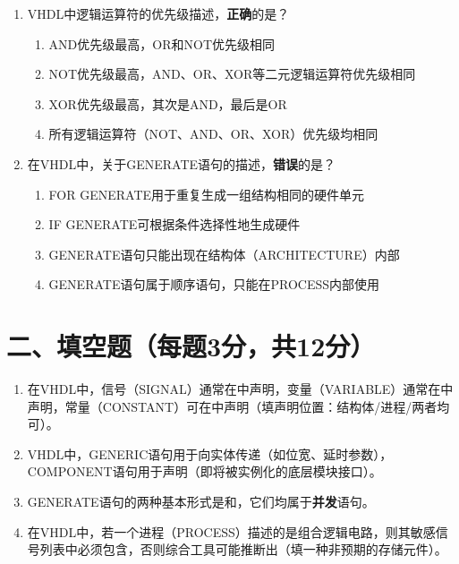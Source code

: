\begin{enumerate}[label=\arabic*.]
\item VHDL中逻辑运算符的优先级描述，\textbf{正确}的是？
\begin{enumerate}[label=\Alph*.]
  \item AND优先级最高，OR和NOT优先级相同
  \item NOT优先级最高，AND、OR、XOR等二元逻辑运算符优先级相同
  \item XOR优先级最高，其次是AND，最后是OR
  \item 所有逻辑运算符（NOT、AND、OR、XOR）优先级均相同
\end{enumerate}

\item 在VHDL中，关于GENERATE语句的描述，\textbf{错误}的是？
\begin{enumerate}[label=\Alph*.]
  \item FOR GENERATE用于重复生成一组结构相同的硬件单元
  \item IF GENERATE可根据条件选择性地生成硬件
  \item GENERATE语句只能出现在结构体（ARCHITECTURE）内部
  \item GENERATE语句属于顺序语句，只能在PROCESS内部使用
\end{enumerate}

\end{enumerate}

\section*{二、填空题（每题3分，共12分）}

\begin{enumerate}[label=\arabic*.]

\item 在VHDL中，信号（SIGNAL）通常在\underline{\hspace{2.5cm}}中声明，变量（VARIABLE）通常在\underline{\hspace{2.5cm}}中声明，常量（CONSTANT）可在\underline{\hspace{2.5cm}}中声明（填声明位置：结构体/进程/两者均可）。

\item VHDL中，GENERIC语句用于向实体传递\underline{\hspace{2.5cm}}（如位宽、延时参数），COMPONENT语句用于声明\underline{\hspace{2.5cm}}（即将被实例化的底层模块接口）。

\item GENERATE语句的两种基本形式是\underline{\hspace{3cm}}和\underline{\hspace{3cm}}，它们均属于\textbf{并发}语句。

\item 在VHDL中，若一个进程（PROCESS）描述的是组合逻辑电路，则其敏感信号列表中必须包含\underline{\hspace{4cm}}，否则综合工具可能推断出\underline{\hspace{2cm}}（填一种非预期的存储元件）。

\end{enumerate}

